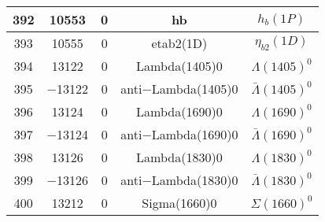 \documentclass{article}
\begin{document}
\begin{table}[!htbp]
\begin{tabular}{|c|c|c|c|c|}
392 & 10553 & 0 & h\underline{\hspace{0.6em}}b & $h_{b}(1P)$ \\
\hline
393 & 10555 & 0 & eta\underline{\hspace{0.6em}}b2(1D) & $\eta_{b2}(1D)$ \\
\hline
394 & 13122 & 0 & Lambda(1405)0 & $\Lambda(1405)^{0}$ \\
\hline
395 & $-$13122 & 0 & anti$-$Lambda(1405)0 & $\bar{\Lambda}(1405)^{0}$ \\
\hline
396 & 13124 & 0 & Lambda(1690)0 & $\Lambda(1690)^{0}$ \\
\hline
397 & $-$13124 & 0 & anti$-$Lambda(1690)0 & $\bar{\Lambda}(1690)^{0}$ \\
\hline
398 & 13126 & 0 & Lambda(1830)0 & $\Lambda(1830)^{0}$ \\
\hline
399 & $-$13126 & 0 & anti$-$Lambda(1830)0 & $\bar{\Lambda}(1830)^{0}$ \\
\hline
400 & 13212 & 0 & Sigma(1660)0 & $\Sigma(1660)^{0}$ \\
\hline
\end{tabular}
\end{table}

\clearpage
\end{document}
